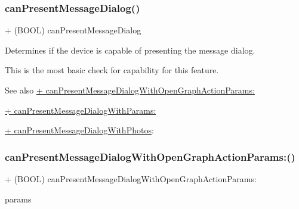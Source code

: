 \subsubsection{\texorpdfstring{can\+Present\+Message\+Dialog()}{canPresentMessageDialog()}\hspace{0.1cm}{\footnotesize\ttfamily [5/5]}}
{\footnotesize\ttfamily + (B\+O\+OL) can\+Present\+Message\+Dialog \begin{DoxyParamCaption}{ }\end{DoxyParamCaption}}

Determines if the device is capable of presenting the message dialog.

This is the most basic check for capability for this feature.

\begin{DoxySeeAlso}{See also}
\hyperlink{interfaceFBDialogs_abc596dd117701ceb160dd63db514cf11}{+ can\+Present\+Message\+Dialog\+With\+Open\+Graph\+Action\+Params\+:} 

\hyperlink{interfaceFBDialogs_a81544299ca98179464ec34fc0e8d12b7}{+ can\+Present\+Message\+Dialog\+With\+Params\+:} 

\hyperlink{interfaceFBDialogs_ac10e310c30d763c7885c11fb44ac4924}{+ can\+Present\+Message\+Dialog\+With\+Photos}\+: 
\end{DoxySeeAlso}
\mbox{\label{interfaceFBDialogs_abc596dd117701ceb160dd63db514cf11}} 
\subsubsection{\texorpdfstring{can\+Present\+Message\+Dialog\+With\+Open\+Graph\+Action\+Params\+:()}{canPresentMessageDialogWithOpenGraphActionParams:()}\hspace{0.1cm}{\footnotesize\ttfamily [1/5]}}
{\footnotesize\ttfamily + (B\+O\+OL) can\+Present\+Message\+Dialog\+With\+Open\+Graph\+Action\+Params\+: \begin{DoxyParamCaption}\item[{(\hyperlink{interfaceFBOpenGraphActionParams}{F\+B\+Open\+Graph\+Action\+Params} $\ast$)}]{params }\end{DoxyParamCaption}}

